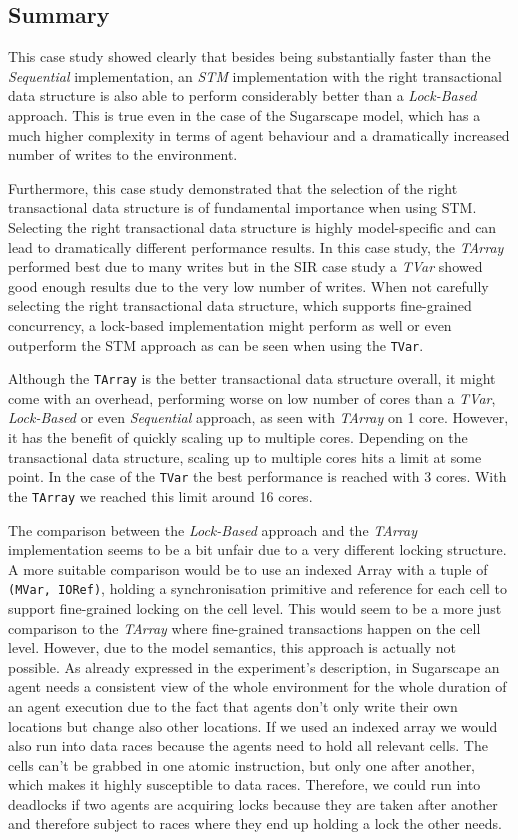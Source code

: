 \subsection{Summary}
This case study showed clearly that besides being substantially faster than the \textit{Sequential} implementation, an \textit{STM} implementation with the right transactional data structure is also able to perform considerably better than a \textit{Lock-Based} approach. This is true even in the case of the Sugarscape model, which has a much higher complexity in terms of agent behaviour and a dramatically increased number of writes to the environment.

Furthermore, this case study demonstrated that the selection of the right transactional data structure is of fundamental importance when using STM. Selecting the right transactional data structure is highly model-specific and can lead to dramatically different performance results. In this case study, the \textit{TArray} performed best due to many writes but in the SIR case study a \textit{TVar} showed good enough results due to the very low number of writes. When not carefully selecting the right transactional data structure, which supports fine-grained concurrency, a lock-based implementation might perform as well or even outperform the STM approach as can be seen when using the \texttt{TVar}.

Although the \texttt{TArray} is the better transactional data structure overall, it might come with an overhead, performing worse on low number of cores than a \textit{TVar}, \textit{Lock-Based} or even \textit{Sequential} approach, as seen with \textit{TArray} on 1 core. However, it has the benefit of quickly scaling up to multiple cores. Depending on the transactional data structure, scaling up to multiple cores hits a limit at some point. In the case of the \texttt{TVar} the best performance is reached with 3 cores. With the \texttt{TArray} we reached this limit around 16 cores.

The comparison between the \textit{Lock-Based} approach and the \textit{TArray} implementation seems to be a bit unfair due to a very different locking structure. A more suitable comparison would be to use an indexed Array with a tuple of \texttt{(MVar, IORef)}, holding a synchronisation primitive and reference for each cell to support fine-grained locking on the cell level. This would seem to be a more just comparison to the \textit{TArray} where fine-grained transactions happen on the cell level. However, due to the model semantics, this approach is actually not possible. As already expressed in the experiment's description, in Sugarscape an agent needs a consistent view of the whole environment for the whole duration of an agent execution due to the fact that agents don't only write their own locations but change also other locations. If we used an indexed array we would also run into data races because the agents need to hold all relevant cells. The cells can't be grabbed in one atomic instruction, but only one after another, which makes it highly susceptible to data races. Therefore, we could run into deadlocks if two agents are acquiring locks because they are taken after another and therefore subject to races where they end up holding a lock the other needs.